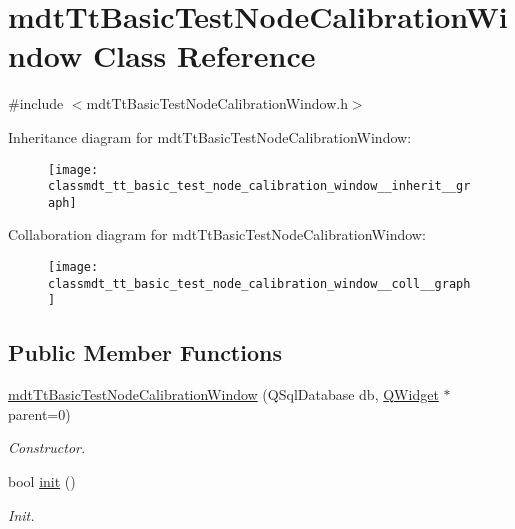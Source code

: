 \hypertarget{classmdt_tt_basic_test_node_calibration_window}{\section{mdt\-Tt\-Basic\-Test\-Node\-Calibration\-Window Class Reference}
\label{classmdt_tt_basic_test_node_calibration_window}
}


{\ttfamily \#include $<$mdt\-Tt\-Basic\-Test\-Node\-Calibration\-Window.\-h$>$}



Inheritance diagram for mdt\-Tt\-Basic\-Test\-Node\-Calibration\-Window\-:\nopagebreak
\begin{figure}[H]
\begin{center}
\leavevmode
\texttt{[image: classmdt\_tt\_basic\_test\_node\_calibration\_window\_\_inherit\_\_graph]}
\end{center}
\end{figure}


Collaboration diagram for mdt\-Tt\-Basic\-Test\-Node\-Calibration\-Window\-:\nopagebreak
\begin{figure}[H]
\begin{center}
\leavevmode
\texttt{[image: classmdt\_tt\_basic\_test\_node\_calibration\_window\_\_coll\_\_graph]}
\end{center}
\end{figure}
\subsection*{Public Member Functions}
\begin{DoxyCompactItemize}
\item 
\hyperlink{classmdt_tt_basic_test_node_calibration_window_a717d3457bd131bd32fb673afa3d77c75}{mdt\-Tt\-Basic\-Test\-Node\-Calibration\-Window} (Q\-Sql\-Database db, \hyperlink{class_q_widget}{Q\-Widget} $\ast$parent=0)
\begin{DoxyCompactList}\small\item\em Constructor. \end{DoxyCompactList}\item 
bool \hyperlink{classmdt_tt_basic_test_node_calibration_window_a9ee28a2f55b8a5bfc5ee3a6af54d5c5d}{init} ()
\begin{DoxyCompactList}\small\item\em Init. \end{DoxyCompactList}\end{DoxyCompactItemize}



